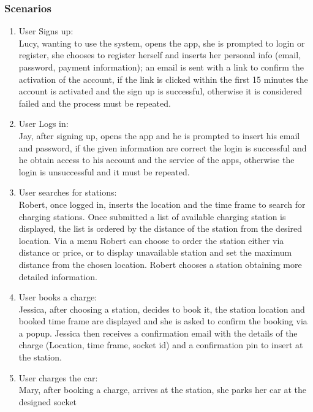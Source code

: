 \subsubsection{Scenarios}
\begin{enumerate}[label=S\arabic*]
      \item User Signs up:\\
            Lucy, wanting to use the system, opens the app, she is prompted to login or register,
            she chooses to register herself and inserts her personal info (email, password, payment information);
            an email is sent with a link to confirm the activation of the account, if the link is clicked within
            the first 15 minutes the account is activated and the sign up is successful,
            otherwise it is considered failed and the process must be repeated.
      \item User Logs in:\\
            Jay, after signing up, opens the app and he is prompted to insert his email and password,
            if the given information are correct the login is successful and he obtain access to his account
            and the service of the apps, otherwise the login is unsuccessful and it must be repeated.
      \item User searches for stations:\\
            Robert, once logged in, inserts the location and the time frame to search for charging stations.
            Once submitted a list of available charging station is displayed, the list is ordered by the distance of the station
            from the desired location. Via a menu Robert can choose to order the station either via distance or price,
            or to display unavailable station and set the maximum distance from the chosen location.
            Robert chooses a station obtaining more detailed information.
      \item User books a charge:\\
            Jessica, after choosing a station, decides to book it, the station location and booked time frame are displayed
            and she is asked to confirm the booking via a popup. Jessica then receives a confirmation email with the details
            of the charge (Location, time frame, socket id) and a confirmation pin to insert at the station.
      \item User charges the car:\\
            Mary, after booking a charge, arrives at the station, she parks her car at the designed socket

\end{enumerate}
